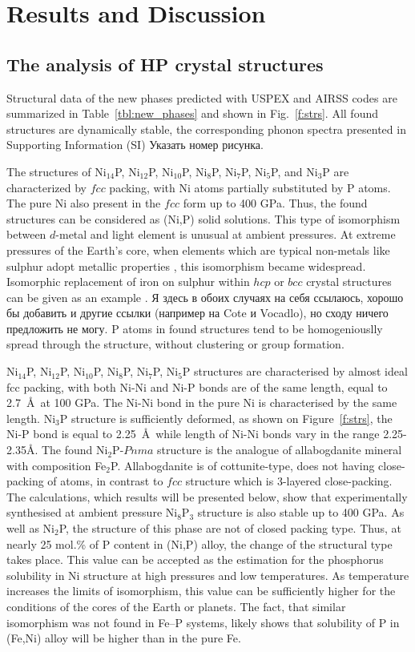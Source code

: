 \documentclass[twoside,twocolumn,9pt]{article}
\begin{document}
\section{Results and Discussion}

\subsection{The analysis of HP crystal structures}
Structural data of the new phases predicted with USPEX and AIRSS codes are summarized in Table~\ref{tbl:new_phases} and shown in Fig.~\ref{f:strs}. All found structures are dynamically stable, the corresponding phonon spectra presented in Supporting Information (SI) Указать номер рисунка.  

The structures of Ni$_{14}$P, Ni$_{12}$P, Ni$_{10}$P, Ni$_8$P, Ni$_7$P, Ni$_5$P, and Ni$_3$P are characterized by $fcc$ packing, with Ni atoms partially substituted by P atoms. 
The pure Ni also present in the $fcc$ form up to 400 GPa.
Thus, the found structures can be considered as (Ni,P) solid solutions.
This type of isomorphism between $d$-metal and light element is unusual at ambient pressures.
At extreme pressures of the Earth's core, when elements which are typical non-metals like sulphur adopt metallic properties \cite{gavr2017_s}, this isomorphism became widespread.
Isomorphic replacement of iron on sulphur within $hcp$ or $bcc$ crystal structures can be given as an example \cite{gavr2016_fes}.
{\color{red} Я здесь в обоих случаях на себя ссылаюсь, хорошо бы добавить и другие ссылки (например на Cote и Vocadlo), но сходу ничего предложить не могу.}
P atoms in found structures tend to be homogeniouslly spread through the structure, without clustering or group formation.

Ni$_{14}$P, Ni$_{12}$P, Ni$_{10}$P, Ni$_8$P, Ni$_7$P, Ni$_5$P structures are characterised by almost ideal fcc packing, with both Ni-Ni and Ni-P bonds are of the same length, equal to 2.7~\AA\ at 100 GPa.
The Ni-Ni bond in the pure Ni is characterised by the same length.
Ni$_3$P structure is sufficiently deformed, as shown on Figure~\ref{f:strs}, the Ni-P bond is equal to 2.25~\AA\, while length of Ni-Ni bonds vary in the range 2.25-2.35\AA.
The found Ni$_2$P-$Pnma$ structure is the analogue of allabogdanite mineral with composition Fe$_2$P.
Allabogdanite is of cottunite-type, does not having close-packing of atoms, in contrast to $fcc$ structure which is 3-layered close-packing.
The calculations, which results will be presented below, show that experimentally synthesised at ambient pressure Ni$_8$P$_3$ structure is also stable up to 400 GPa.
As well as Ni$_2$P, the structure of this phase are not of closed packing type.
Thus, at nearly 25 mol.\% of P content in (Ni,P) alloy, the change of the structural type takes place.
This value can be accepted as the estimation for the phosphorus solubility in Ni structure at high pressures and low temperatures.
As temperature increases the limits of isomorphism, this value can be sufficiently higher for the conditions of the cores of the Earth or planets.
The fact, that similar isomorphism was not found in Fe--P systems, likely shows that solubility of P in (Fe,Ni) alloy will be higher than in the pure Fe.
\end{document}
